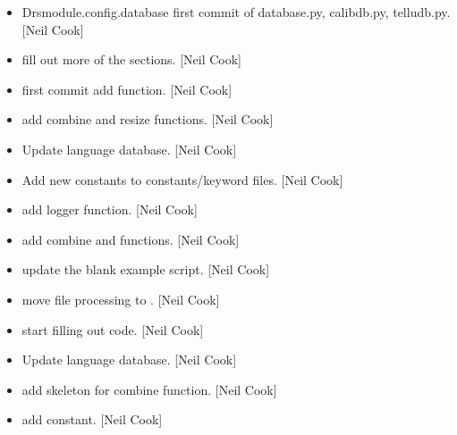 \documentclass[a4paper,10pt,english]{report}
\begin{document}
\begin{itemize}
\item {} 
Drsmodule.config.database \sphinxhyphen{} first commit of database.py, calibdb.py,
telludb.py. {[}Neil Cook{]}

\item {} 
 \sphinxhyphen{} fill out more of the sections. {[}Neil Cook{]}

\item {} 
 \sphinxhyphen{} first commit add  function. {[}Neil Cook{]}

\item {} 
 \sphinxhyphen{} add combine and resize functions. {[}Neil Cook{]}

\item {} 
Update language database. {[}Neil Cook{]}

\item {} 
Add new constants to constants/keyword files. {[}Neil Cook{]}

\item {} 
 \sphinxhyphen{} add  logger function. {[}Neil Cook{]}

\item {} 
 \sphinxhyphen{} add combine and  functions. {[}Neil Cook{]}

\item {} 
 \sphinxhyphen{} update the blank example script. {[}Neil Cook{]}

\item {} 
 \sphinxhyphen{} move file processing to
. {[}Neil Cook{]}

\item {} 
 \sphinxhyphen{} start filling out code. {[}Neil Cook{]}

\item {} 
Update language database. {[}Neil Cook{]}

\item {} 
 \sphinxhyphen{} add skeleton for combine function. {[}Neil Cook{]}

\item {} 
 \sphinxhyphen{} add 
constant. {[}Neil Cook{]}


\end{itemize}
\end{document}
